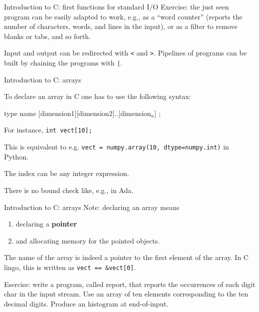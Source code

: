 \begin{frame}[fragile]{Introduction to C: first functions for standard I/O}
Exercise:
the just seen program can be easily adapted to work, e.g.,
as a ``word counter'' (reports the number of characters,
words, and lines in the input), or as a filter to remove blanks or
tabs, and so forth.


\vspace{20pt}

Input and output can be redirected with \verb"<" and \verb">".
Pipelines of programs can be built by chaining the programs with \verb"|".


\end{frame}
\begin{frame}[fragile]{Introduction to C: arrays}

To declare an array in C one has to use the following
syntax:

\vspace{20pt}

\begin{center}type name [dimension1][dimension2]..[dimension${}_n$] ;
\end{center} 


\vspace{20pt}

For instance, {\tt int vect[10];}


\vspace{20pt}

This is equivalent to e.g.
{\tt vect = numpy.array(10, dtype=numpy.int)}
in Python.


\vspace{20pt}


The index can be any integer expression.
  

\vspace{20pt}

There is no bound check like, e.g., in Ada.


\end{frame}
\begin{frame}[fragile]{Introduction to C: arrays}
Note: declaring an array means
\begin{enumerate}
\item declaring a \textbf{pointer}
\item and allocating memory for the pointed objects.
\end{enumerate}
The name of the array is indeed a pointer to the first element of the
array. In C lingo, this is written as
{\tt vect == \&vect[0]}. \label{arrayref}


\vspace{20pt}

Esercise: write a program, called report, that reports the occurrences of
each digit char in the input stream. Use an array of ten elements corresponding
to the ten decimal digits. Produce an histogram at end-of-input.

\end{frame}
